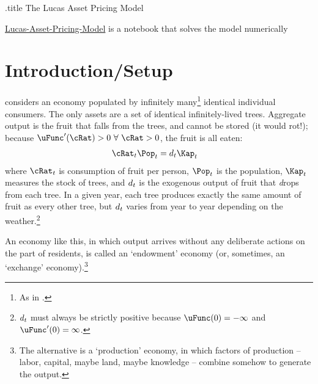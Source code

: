 \documentclass{\handout}
\begin{document}
\handoutHeader

\begin{verbatimwrite}{\jobname.title}
The Lucas Asset Pricing Model
\end{verbatimwrite}


\handoutNameMake
\centerline{\small \href{https://econ-ark.org/materials/lucas-asset-pricing-model?launch}{Lucas-Asset-Pricing-Model} is a notebook that solves the model numerically}

\hypertarget{introduction-setup}{}
\section{Introduction/Setup}


\cite{lucas:assetpricing} considers an economy populated by infinitely many\footnote{As in \Aggregation.}  identical individual consumers.  The only assets are a set of identical infinitely-lived trees.  Aggregate output is the fruit that falls from the trees, and cannot be stored (it would rot!); because $\uFunc^{\prime}(\cRat)>0~\forall~\cRat > 0$, the fruit is all eaten:
\begin{equation}\begin{gathered}\begin{aligned}
\cRat_{t}\Pop_{t} & =  \dvdnd_{t}\Kap_{t} \label{eq:CeqY}
\end{aligned}\end{gathered}\end{equation}
where $\cRat_{t}$ is consumption of fruit per person, $\Pop_{t}$ is the population, $\Kap_{t}$ measures the stock of trees, and $d_{t}$ is the exogenous output of fruit that \textit{d}rops from each tree.  In a given year, each tree produces exactly the same amount of fruit as every other tree, but $d_{t}$ varies from year to year depending on the weather.\footnote{$d_{t}$ must always be strictly positive because $\uFunc(0) = -\infty$ and $\uFunc^{\prime}(0)=\infty$.}

An economy like this, in which output arrives without any deliberate actions on the part of residents, is called an `endowment' economy (or, sometimes, an `exchange' economy).\footnote{The alternative is a `production' economy, in which factors of production -- labor, capital, maybe land, maybe knowledge -- combine somehow to generate the output.}   
\end{document}
